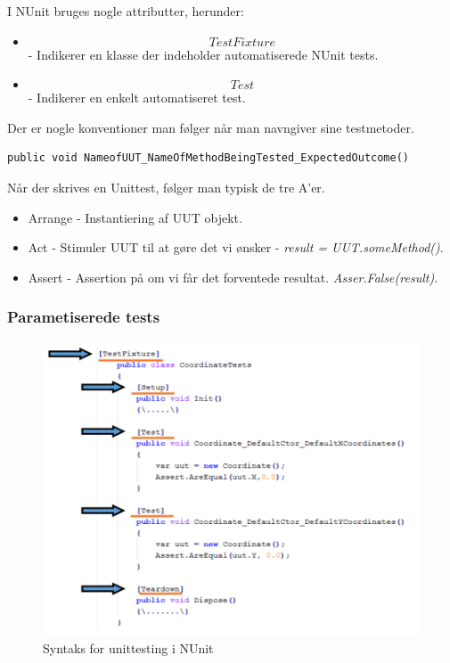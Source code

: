 I NUnit bruges nogle attributter, herunder:

\begin{itemize}
	\item \[TestFixture\] - Indikerer en klasse der indeholder automatiserede NUnit tests. 
	\item \[Test\] - Indikerer en enkelt automatiseret test.
\end{itemize}

Der er nogle konventioner man følger når man navngiver sine testmetoder.

\begin{lstlisting}
public void NameofUUT_NameOfMethodBeingTested_ExpectedOutcome()
\end{lstlisting}

Når der skrives en Unittest, følger man typisk de tre A'er.

\begin{itemize}
	\item Arrange - Instantiering af UUT objekt.
	\item Act - Stimuler UUT til at gøre det vi ønsker - \textit{result = UUT.someMethod()}.
	\item Assert - Assertion på om vi får det forventede resultat. \textit{Asser.False(result)}.
\end{itemize}

\subsubsection{Parametiserede tests}


\begin{figure}
\centering
\includegraphics[width=0.7\linewidth]{figs/testFixture.PNG}
\caption{Syntaks for unittesting i NUnit}
\label{fig:testFixture}
\end{figure}

